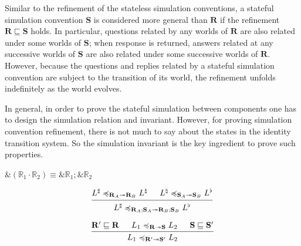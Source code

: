 \documentclass[acmsmall,screen,review,anonymous]{acmart}
\renewcommand{\preceq}{\preccurlyeq}
\begin{document}
Similar to the refinement of the stateless simulation conventions,
a stateful simulation convention $\mathbf{S}$
is considered more general than $\mathbf{R}$
if the refinement $\mathbf{R} \sqsubseteq \mathbf{S}$ holds.
In particular, questions related by any worlds of $\mathbf{R}$
are also related under some worlds of $\mathbf{S}$;
when response is returned,
answers related at any successive worlds of $\mathbf{S}$
are also related under some successive worlds of $\mathbf{R}$.
However, because the questions and replies related
by a stateful simulation convention
are subject to the transition of its world,
the refinement unfolds indefinitely as the world evolves.

In general, in order to prove the stateful simulation between components
one has to design the simulation relation and invariant.
However, for proving simulation convention refinement,
there is not much to say about the states in the identity transition system.
So the simulation invariant is the key ingredient to prove such properties.

\begin{lemma}
$ \&(\mathbb{R}_1 \cdot \mathbb{R}_2) \equiv
   \&\mathbb{R}_1 \mathop; \&\mathbb{R}_2 $
\end{lemma}

\begin{theorem} \label{thm:svcomp}
\[
  \begin{prooftree}
    \hypo{L^\sharp
      \preceq_{\mathbf{R}_A \twoheadrightarrow \mathbf{R}_B}
      L^\natural}
    \hypo{L^\natural
      \preceq_{\mathbf{S}_A \twoheadrightarrow \mathbf{S}_B}
      L^\flat}
    \infer2{L^\sharp
      \preceq_{\mathbf{R}_A \mathbin; \mathbf{S}_A \twoheadrightarrow
	   \mathbf{R}_B \mathbin; \mathbf{S}_B}
      L^\flat}
  \end{prooftree}
\]
\end{theorem}

\begin{theorem} \label{thm:scseq}
  \[
    \begin{prooftree}
      \hypo{\mathbf{R'} \sqsubseteq \mathbf{R}}
      \hypo{L_1 \preceq_{\mathbf{R} \twoheadrightarrow \mathbf{S}} L_2}
      \hypo{\mathbf{S} \sqsubseteq \mathbf{S'}}
      \infer3{L_1 \preceq_{\mathbf{R'} \twoheadrightarrow \mathbf{S'}} L_2}
    \end{prooftree}
  \]
\end{theorem}
\end{document}
